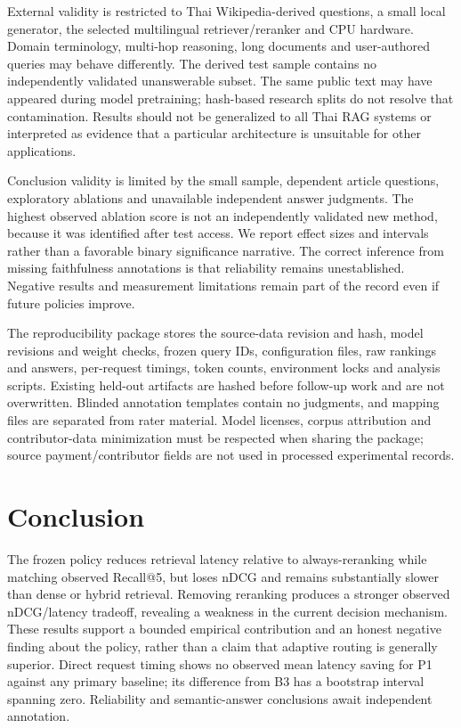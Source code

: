 \documentclass[10pt,a4paper]{article}
\begin{document}
External validity is restricted to Thai Wikipedia-derived questions, a
small local generator, the selected multilingual retriever/reranker and
CPU hardware. Domain terminology, multi-hop reasoning, long documents
and user-authored queries may behave differently. The derived test
sample contains no independently validated unanswerable subset. The same
public text may have appeared during model pretraining; hash-based
research splits do not resolve that contamination. Results should not be
generalized to all Thai RAG systems or interpreted as evidence that a
particular architecture is unsuitable for other applications.

Conclusion validity is limited by the small sample, dependent article
questions, exploratory ablations and unavailable independent answer
judgments. The highest observed ablation score is not an independently
validated new method, because it was identified after test access. We
report effect sizes and intervals rather than a favorable binary
significance narrative. The correct inference from missing faithfulness
annotations is that reliability remains unestablished. Negative results
and measurement limitations remain part of the record even if future
policies improve.

The reproducibility package stores the source-data revision and hash,
model revisions and weight checks, frozen query IDs, configuration
files, raw rankings and answers, per-request timings, token counts,
environment locks and analysis scripts. Existing held-out artifacts are
hashed before follow-up work and are not overwritten. Blinded annotation
templates contain no judgments, and mapping files are separated from
rater material. Model licenses, corpus attribution and contributor-data
minimization must be respected when sharing the package; source
payment/contributor fields are not used in processed experimental
records.

\hypertarget{conclusion}{%
\section{Conclusion}\label{conclusion}}

The frozen policy reduces retrieval latency relative to always-reranking
while matching observed Recall@5, but loses nDCG and remains
substantially slower than dense or hybrid retrieval. Removing reranking
produces a stronger observed nDCG/latency tradeoff, revealing a weakness
in the current decision mechanism. These results support a bounded
empirical contribution and an honest negative finding about the policy,
rather than a claim that adaptive routing is generally superior. Direct
request timing shows no observed mean latency saving for P1 against any
primary baseline; its difference from B3 has a bootstrap interval
spanning zero. Reliability and semantic-answer conclusions await
independent annotation.



\end{document}
